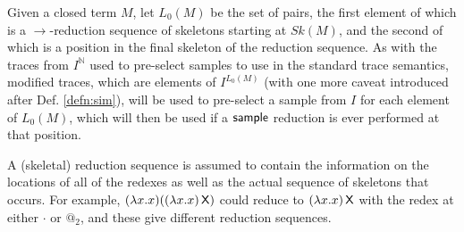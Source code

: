 Given a closed term $M$, let $L_0(M)$ be the set of pairs, the first element of which is a $\to$-reduction sequence of skeletons starting at $\mathit{Sk}(M)$, and the second of which is a position in the final skeleton of the reduction sequence. 
As with the traces from $I^{\mathbb N}$ used to pre-select samples to use in the standard trace semantics, modified traces, which are elements of $I^{L_0(M)}$ (with one more caveat introduced after Def. \ref{defn:sim}), will be used to pre-select a sample from $I$ for each element of $L_0(M)$, which will then be used if a $\mathsf{sample}$ reduction is ever performed at that position.


A (skeletal) reduction sequence is assumed to contain the information on the locations of all of the redexes as well as the actual sequence of skeletons that occurs. For example, $(\lambda x. x) ((\lambda x. x) \, \mathsf{X})$ could reduce to $(\lambda x. x) \, \mathsf{X}$ with the redex at either $\cdot$ or $@_2$, and these give different reduction sequences.

